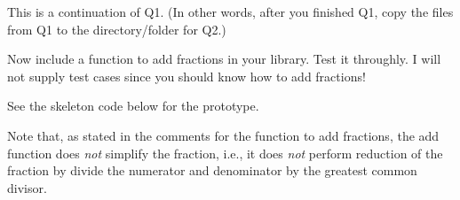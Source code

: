 This is a continuation of Q1.
(In other words, after you finished Q1, copy the files from Q1
to the directory/folder for Q2.)

Now include a function to add fractions in your library.
Test it throughly.
I will not supply test cases since you should know how to add fractions!

See the skeleton code below for the prototype.

Note that, as stated in the comments for the function to add fractions,
the add function does \textit{not} simplify the fraction, i.e.,
it does \textit{not} perform reduction of the fraction
by divide the numerator and denominator by the greatest common divisor.
